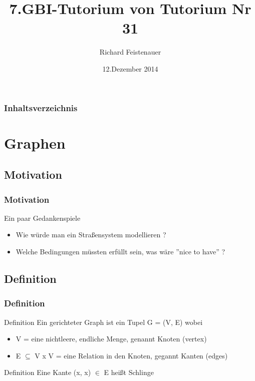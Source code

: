 \documentclass{beamer}
\author{Richard Feistenauer}
\title{7.GBI-Tutorium von Tutorium Nr 31}
\date{12.Dezember 2014}
\begin{document}
\begin {frame}
	\titlepage
\end {frame}

\begin {frame}
	\frametitle {Inhaltsverzeichnis}
	\tableofcontents
\end {frame}

\section{Graphen} 
\subsection{Motivation}

\begin{frame}
	\frametitle{Motivation}

	\begin{block}{Ein paar Gedankenspiele}

		\begin{itemize}
			\item Wie w\"urde man ein Stra{\ss}ensystem modellieren ?
			\item Welche Bedingungen m\"ussten erf\"ullt sein, was w\"are ''nice to have'' ?
		\end{itemize}


	\end{block}
\end{frame}

\subsection{Definition}

\begin{frame}
	\frametitle{Definition}
	\begin{block}{Definition}
		Ein gerichteter Graph ist ein Tupel G = (V, E) wobei
		\begin{itemize}
			\item V = eine nichtleere, endliche Menge, genannt Knoten (vertex)
			\item E $\subseteq$ V x V = eine Relation in den Knoten, gegannt Kanten (edges)
		\end{itemize}	
	\end{block}
	\begin{block}{Definition}
		Eine Kante (x, x) $\in$ E hei{\ss}t Schlinge
	\end{block}
\end{frame}
\end{document}
